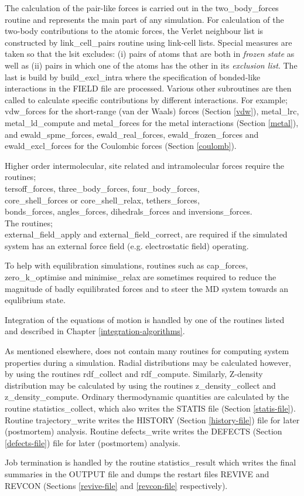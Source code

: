 The calculation of the pair-like forces is carried out in the
{\sc two\_body\_forces} routine and represents the main part of any
simulation.  For calculation of the two-body contributions to the
atomic forces, the Verlet neighbour list
is constructed by {\sc link\_cell\_pairs} routine using link-cell
lists.  Special measures are taken so that the lsit excludes: (i)
pairs of atoms that are both in {\em frozen state} as well as (ii)
pairs in which one of the atoms has the other in its
{\em exclusion list}.  The last is build by {\sc build\_excl\_intra}
where the specification of bonded-like interactions in the FIELD file
are processed.  Various other subroutines are then called to
calculate specific contributions by different interactions.  For example;
{\sc vdw\_forces} for the short-range (van der Waals)
forces (Section \ref{vdw}), {\sc metal\_lrc}, {\sc metal\_ld\_compute} and
{\sc metal\_forces} for the metal interactions 
(Section \ref{metal}), and {\sc ewald\_spme\_forces}, {\sc ewald\_real\_forces},
{\sc ewald\_frozen\_forces} and {\sc ewald\_excl\_forces} for the
Coulombic forces (Section \ref{coulomb}).

Higher order intermolecular, site
related and intramolecular forces
require the routines; \\
{\sc tersoff\_forces}, {\sc three\_body\_forces},
{\sc four\_body\_forces}, \\
{\sc core\_shell\_forces} or {\sc core\_shell\_relax},
{\sc tethers\_forces}, \\
{\sc bonds\_forces}, {\sc angles\_forces}, {\sc dihedrals\_forces}
and {\sc inversions\_forces}.  \\
The routines; \\
{\sc external\_field\_apply} and {\sc external\_field\_correct},
are required if the simulated system has an external force field
(e.g. electrostatic field) operating.

To help with equilibration simulations, routines such as
{\sc cap\_forces}, {\sc zero\_k\_optimise} and {\sc minimise\_relax}
are sometimes required to reduce the magnitude of badly
equilibrated forces and to steer the MD system towards an
equlibrium state.

Integration of the equations of motion is handled by one of the
routines listed and described in Chapter \ref{integration-algorithms}.

As mentioned elsewhere, \D does not contain many routines for
computing system properties during a simulation.  Radial
distributions may be calculated however, by using the routines
{\sc rdf\_collect} and {\sc rdf\_compute}.  Similarly, Z-density
distribution may be calculated by using the routines
{\sc z\_density\_collect} and {\sc z\_density\_compute}.  Ordinary
thermodynamic quantities are calculated by the routine
{\sc statistics\_collect}, which also writes the STATIS file (Section
\ref{statis-file}).  Routine {\sc trajectory\_write} writes the
HISTORY (Section \ref{history-file}) file for later (postmortem)
analysis.  Routine {\sc defects\_write} writes the DEFECTS (Section
\ref{defects-file}) file for later (postmortem) analysis.

Job termination is handled by the routine {\sc statistics\_result}
which writes the final summaries in the OUTPUT file and dumps the
restart files REVIVE and REVCON (Sections \ref{revive-file} and
\ref{revcon-file} respectively).
